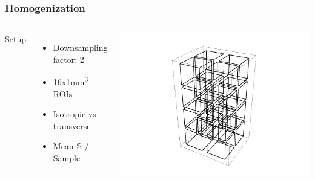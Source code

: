 \documentclass[xcolor=table,11pt]{beamer}
\begin{document}
	\begin{frame}
		\frametitle{Homogenization}

		\begin{columns}
			\vfill
			Setup
			\begin{itemize}
				\item Downsampling factor: 2
				\item 16x1mm\textsuperscript{3} ROIs
				\item Isotropic vs transverse
				\item Mean $\mathbb{S}$ / Sample
			\end{itemize}
			\vfill

			\vfill
			\includegraphics[width=\linewidth, trim=200 0 0 0]{05_Homogenization/Plots/ROIs}\\
			\vfill

		\end{columns}
	\end{frame}
\end{document}
